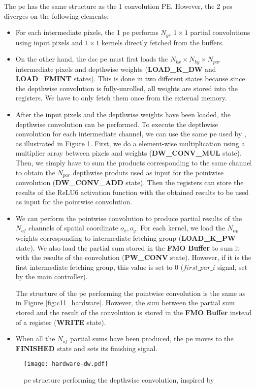 The \acrshort{pe} has the same structure as the 1 convolution PE. However, the 2 \acrshort{pe}s diverges on the following elements:
\begin{itemize}
    \item For each intermediate pixels, the 1 \acrshort{pe} performs $N_{gr}$ $1 \times 1$ partial convolutions using input pixels and $1 \times 1$ kernels directly fetched from the buffers.
    \item On the other hand, the \acrshort{dsc} \acrshort{pe} must first loads the $N_{kx} \times N_{ky} \times N_{par}$ intermediate pixels and depthwise weights (\textbf{LOAD\_K\_DW} and \textbf{LOAD\_FMINT} states). This is done in two different states because since the depthwise convolution is fully-unrolled, all weights are stored into the registers. We have to only fetch them once from the external memory.
    \item After the input pixels and the depthwise weights have been loaded, the depthwise convolution can be performed. To execute the depthwise convolution for each intermediate channel, we can use the same \acrshort{pe} used by \textcite{bai_cnn_2018}, as illustrated in Figure \ref{fig:dsc_hardware}. First, we do a element-wise multiplication using a multiplier array between pixels and weights (\textbf{DW\_CONV\_MUL} state). Then, we simply have to sum the products corresponding to the same channel to obtain the $N_{par}$ depthwise produts used as input for the pointwise convolution (\textbf{DW\_CONV\_ADD} state). Then the registers can store the results of the ReLU6 activation function with the obtained results to be used as input for the pointwise convolution.
    \item We can perform the pointwise convolution to produce partial results of the $N_{of}$ channels of spatial coordinate $o_x, o_y$. For each kernel, we load the $N_{np}$ weights corresponding to intermediate fetching group (\textbf{LOAD\_K\_PW} state). We also load the partial sum stored in the \textbf{FMO Buffer} to sum it with the results of the convolution (\textbf{PW\_CONV} state). However, if it is the first intermediate fetching group, this value is set to 0 ($first\_par\_i$ signal, set by the main controller).
    
    The structure of the \acrshort{pe} performing the pointwise convolution is the same as in Figure \ref{fig:c11_hardware}. However, the sum between the partial sum stored and the result of the convolution is stored in the \textbf{FMO Buffer} instead of a register (\textbf{WRITE} state).
    \item When all the $N_{of}$ partial sums have been produced, the \acrshort{pe} moves to the \textbf{FINISHED} state and sets its finishing signal.
\end{itemize}
%
\begin{figure}[H]
    \centering
    \texttt{[image: hardware-dw.pdf]}
    \caption{\acrshort{pe} structure performing the depthwise convolution, inspired by \cite{bai_cnn_2018}}
    \label{fig:dsc_hardware}
\end{figure}

